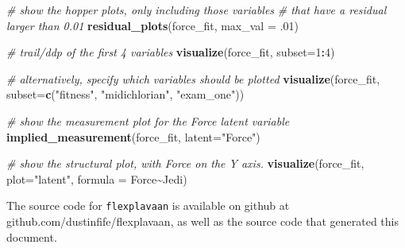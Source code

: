 \documentclass[
  english,
  man]{apa6}
\newenvironment{Shaded}{\begin{snugshade}}{\end{snugshade}}
\newcommand{\CommentTok}[1]{\textcolor[rgb]{0.56,0.35,0.01}{\textit{#1}}}
\newcommand{\DataTypeTok}[1]{\textcolor[rgb]{0.13,0.29,0.53}{#1}}
\newcommand{\DecValTok}[1]{\textcolor[rgb]{0.00,0.00,0.81}{#1}}
\newcommand{\FloatTok}[1]{\textcolor[rgb]{0.00,0.00,0.81}{#1}}
\newcommand{\KeywordTok}[1]{\textcolor[rgb]{0.13,0.29,0.53}{\textbf{#1}}}
\newcommand{\NormalTok}[1]{#1}
\newcommand{\OperatorTok}[1]{\textcolor[rgb]{0.81,0.36,0.00}{\textbf{#1}}}
\newcommand{\StringTok}[1]{\textcolor[rgb]{0.31,0.60,0.02}{#1}}
\begin{document}
\begin{Shaded}
\begin{Highlighting}[]
\CommentTok{\# show the hopper plots, only including those variables }
\CommentTok{\# that have a residual larger than 0.01}
\KeywordTok{residual\_plots}\NormalTok{(force\_fit, }\DataTypeTok{max\_val =} \FloatTok{.01}\NormalTok{)}

\CommentTok{\# trail/ddp of the first 4 variables}
\KeywordTok{visualize}\NormalTok{(force\_fit, }\DataTypeTok{subset=}\DecValTok{1}\OperatorTok{:}\DecValTok{4}\NormalTok{)}

\CommentTok{\# alternatively, specify which variables should be plotted}
\KeywordTok{visualize}\NormalTok{(force\_fit, }\DataTypeTok{subset=}\KeywordTok{c}\NormalTok{(}\StringTok{"fitness"}\NormalTok{, }\StringTok{"midichlorian"}\NormalTok{, }\StringTok{"exam\_one"}\NormalTok{))}

\CommentTok{\# show the measurement plot for the Force latent variable}
\KeywordTok{implied\_measurement}\NormalTok{(force\_fit, }\DataTypeTok{latent=}\StringTok{"Force"}\NormalTok{)}

\CommentTok{\# show the structural plot, with Force on the Y axis. }
\KeywordTok{visualize}\NormalTok{(force\_fit, }\DataTypeTok{plot=}\StringTok{"latent"}\NormalTok{, }\DataTypeTok{formula =}\NormalTok{ Force}\OperatorTok{\textasciitilde{}}\NormalTok{Jedi)}
\end{Highlighting}
\end{Shaded}

The source code for \texttt{flexplavaan} is available on github at github.com/dustinfife/flexplavaan, as well as the source code that generated this document.
\end{document}
